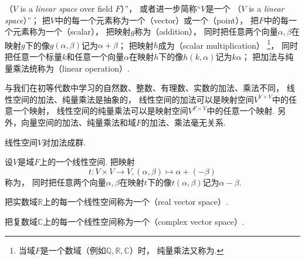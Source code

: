 \begin{definition}
（\(V\) is a \emph{linear space} over field \(F\)）”，
或者进一步简称“\(V\)是一个%
（\(V\) is a \emph{linear space}）”；
把\(V\)中的每一个元素称为一个（vector）或一个（point），
把\(F\)中的每一个元素称为一个（scalar），
把映射\(g\)称为（addition），
同时把任意两个向量\(\alpha,\beta\)在映射\(g\)下的像\(g(\alpha,\beta)\)记为\(\alpha + \beta\)；
把映射\(h\)成为（scalar multiplication）
\footnote{
	当域\(F\)是一个数域（例如\(\mathbb{Q},\mathbb{R},\mathbb{C}\)）时，
	纯量乘法又称为.
}，
同时把任意一个标量\(k\)和任意一个向量\(\alpha\)在映射\(h\)下的像\(h(k,\alpha)\)记为\(k \alpha\)；
把加法与纯量乘法统称为（linear operation）.
\end{definition}
\begin{remark}
与我们在初等代数中学习的自然数、整数、有理数、实数的加法、乘法不同，
线性空间的加法、纯量乘法是抽象的，
线性空间的加法可以是映射空间\(V^{V \times V}\)中的任意一个映射，
线性空间的纯量乘法可以是映射空间\(V^{F \times V}\)中的任意一个映射.
另外，向量空间的加法、纯量乘法和域\(F\)的加法、乘法毫无关系.
\end{remark}
\begin{remark}
线性空间\(V\)对加法成群.
\end{remark}

\begin{definition}
设\(V\)是域\(F\)上的一个线性空间.
把映射\begin{equation*}
	t\colon V \times V \to V,
	(\alpha,\beta) \mapsto \alpha + (-\beta)
\end{equation*}
称为，
同时把任意两个向量\(\alpha,\beta\)在映射\(t\)下的像\(t(\alpha,\beta)\)记为\(\alpha - \beta\).
\end{definition}

\begin{definition}
把实数域\(\mathbb{R}\)上的每一个线性空间称为一个（real vector space）.
\end{definition}

\begin{definition}
把复数域\(\mathbb{C}\)上的每一个线性空间称为一个（complex vector space）.
\end{definition}

